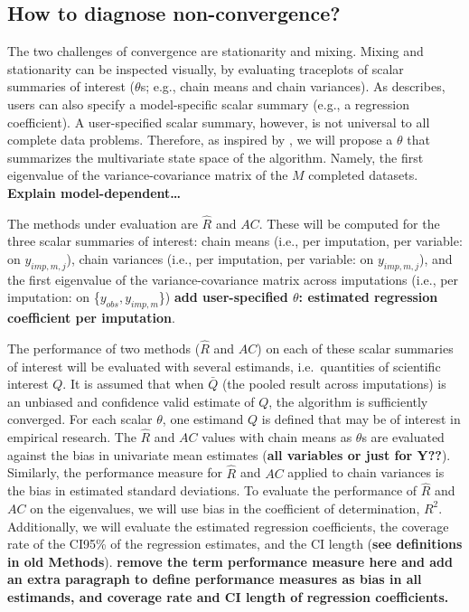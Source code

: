 \documentclass[Royal,times,sageh]{sagej}
\begin{document}
\hypertarget{how-to-diagnose-non-convergence}{%
\subsection{How to diagnose
non-convergence?}\label{how-to-diagnose-non-convergence}}

The two challenges of convergence are stationarity and mixing. Mixing
and stationarity can be inspected visually, by evaluating traceplots of
scalar summaries of interest (\(\theta\)s; e.g., chain means and chain
variances). As \citet{buur18} describes, users can also specify a
model-specific scalar summary (e.g., a regression coefficient). A
user-specified scalar summary, however, is not universal to all complete
data problems. Therefore, as inspired by \citep{mack03}, we will propose
a \(\theta\) that summarizes the multivariate state space of the
algorithm. Namely, the first eigenvalue of the variance-covariance
matrix of the \(M\) completed datasets. \textbf{Explain
model-dependent\ldots{}}

The methods under evaluation are \(\widehat{R}\) and \(AC\). These will
be computed for the three scalar summaries of interest: chain means
(i.e., per imputation, per variable: on \(y_{imp, m, j}\)), chain
variances (i.e., per imputation, per variable: on \(y_{imp, m, j}\)),
and the first eigenvalue of the variance-covariance matrix across
imputations (i.e., per imputation: on \{\(y_{obs}, y_{imp, m}\)\})
\textbf{add user-specified \(\theta\): estimated regression coefficient
per imputation}.

The performance of two methods (\(\widehat{R}\) and \(AC\)) on each of
these scalar summaries of interest will be evaluated with several
estimands, i.e.~quantities of scientific interest \(Q\). It is assumed
that when \(\bar{Q}\) (the pooled result across imputations) is an
unbiased and confidence valid estimate of \(Q\), the algorithm is
sufficiently converged. For each scalar \(\theta\), one estimand \(Q\)
is defined that may be of interest in empirical research. The
\(\widehat{R}\) and \(AC\) values with chain means as \(\theta\)s are
evaluated against the bias in univariate mean estimates (\textbf{all
variables or just for Y??}). Similarly, the performance measure for
\(\widehat{R}\) and \(AC\) applied to chain variances is the bias in
estimated standard deviations. To evaluate the performance of
\(\widehat{R}\) and \(AC\) on the eigenvalues, we will use bias in the
coefficient of determination, \(R^2\). Additionally, we will evaluate
the estimated regression coefficients, the coverage rate of the CI95\%
of the regression estimates, and the CI length (\textbf{see definitions
in old Methods}). \textbf{remove the term performance measure here and
add an extra paragraph to define performance measures as bias in all
estimands, and coverage rate and CI length of regression coefficients.}
\end{document}
